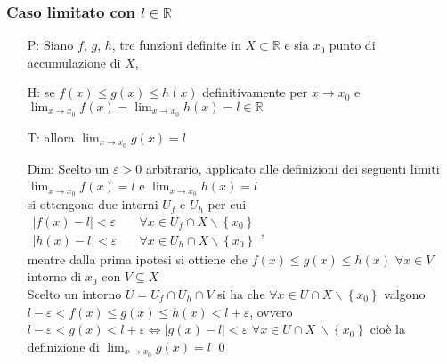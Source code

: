\documentclass[a4paper]{article}
\begin{document}
\subsubsection*{Caso limitato con \(l \in \mathbb{R}\)}
\begin{itemize}
	\item[P:] Siano \(f\), \(g\), \(h\), tre funzioni definite in \(X \subset \mathbb{R}\) e sia \(x_0\) punto di accumulazione di \(X\),
	\item[H:] se \(f(x) \leq g(x) \leq h(x)\) definitivamente per \(x \to x_0\) e \(\displaystyle \lim_{x \to x_0} f(x) = \lim_{x \to x_0} h(x) = l \in \mathbb{R}\)
	\item[T:] allora \(\displaystyle \lim_{x \to x_0} g(x) = l\)
	\item[Dim:] Scelto un \(\varepsilon > 0\) arbitrario, applicato alle definizioni dei seguenti limiti \(\displaystyle \lim_{x \to x_0} f(x) = l\) e \(\displaystyle \lim_{x \to x_0} h(x) = l\) \\
	si ottengono due intorni \(U_f\) e \(U_h\) per cui \(\begin{aligned}
		\left| f(x) - l \right| < \varepsilon \quad &\forall x \in U_f \cap X \backslash \left\{ x_0 \right\} \\
		\left| h(x) - l \right| < \varepsilon \quad &\forall x \in U_h \cap X \backslash \left\{ x_0 \right\}
	\end{aligned}\), \\ 
	mentre dalla prima ipotesi si ottiene che \(f(x) \leq g(x) \leq h(x)\) \(\forall x \in V\) intorno di \(x_0\) con \(V \subseteq X\) \\
	Scelto un intorno \(U = U_f \cap U_h \cap V\) si ha che \(\forall x \in U \cap X \backslash \left\{ x_0 \right\}\) valgono \\
	\(l - \varepsilon < f(x) \leq g(x) \leq h(x) < l + \varepsilon\), ovvero \(l - \varepsilon < g(x) < l + \varepsilon \Leftrightarrow \left| g(x) - l \right| < \varepsilon\) \(\forall x \in U \cap X \; \backslash \left\{ x_0 \right\}\)
	cioè la definizione di \(\displaystyle \lim_{x \to x_0} g(x) = l\) \qed
\end{itemize}
\end{document}
